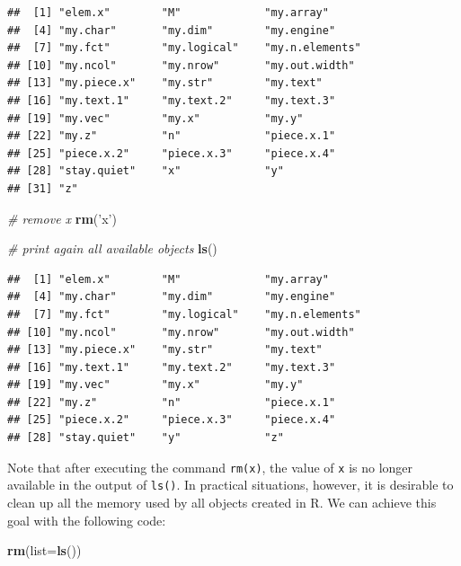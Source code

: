 \documentclass[11pt,]{book}
\newenvironment{Shaded}{\begin{snugshade}}{\end{snugshade}}
\newcommand{\KeywordTok}[1]{\textcolor[rgb]{0.27,0.27,0.27}{\textbf{#1}}}
\newcommand{\DataTypeTok}[1]{\textcolor[rgb]{0.27,0.27,0.27}{#1}}
\newcommand{\StringTok}[1]{\textcolor[rgb]{0.5,0.5,0.5}{#1}}
\newcommand{\CommentTok}[1]{\textcolor[rgb]{0.56,0.35,0.01}{\textit{#1}}}
\newcommand{\NormalTok}[1]{#1}
\begin{document}
\begin{verbatim}
##  [1] "elem.x"        "M"             "my.array"     
##  [4] "my.char"       "my.dim"        "my.engine"    
##  [7] "my.fct"        "my.logical"    "my.n.elements"
## [10] "my.ncol"       "my.nrow"       "my.out.width" 
## [13] "my.piece.x"    "my.str"        "my.text"      
## [16] "my.text.1"     "my.text.2"     "my.text.3"    
## [19] "my.vec"        "my.x"          "my.y"         
## [22] "my.z"          "n"             "piece.x.1"    
## [25] "piece.x.2"     "piece.x.3"     "piece.x.4"    
## [28] "stay.quiet"    "x"             "y"            
## [31] "z"
\end{verbatim}

\begin{Shaded}
\begin{Highlighting}[]
\CommentTok{# remove x}
\KeywordTok{rm}\NormalTok{(}\StringTok{'x'}\NormalTok{)}

\CommentTok{# print again all available objects}
\KeywordTok{ls}\NormalTok{()}
\end{Highlighting}
\end{Shaded}

\begin{verbatim}
##  [1] "elem.x"        "M"             "my.array"     
##  [4] "my.char"       "my.dim"        "my.engine"    
##  [7] "my.fct"        "my.logical"    "my.n.elements"
## [10] "my.ncol"       "my.nrow"       "my.out.width" 
## [13] "my.piece.x"    "my.str"        "my.text"      
## [16] "my.text.1"     "my.text.2"     "my.text.3"    
## [19] "my.vec"        "my.x"          "my.y"         
## [22] "my.z"          "n"             "piece.x.1"    
## [25] "piece.x.2"     "piece.x.3"     "piece.x.4"    
## [28] "stay.quiet"    "y"             "z"
\end{verbatim}

Note that after executing the command
\texttt{rm(\textquotesingle{}x\textquotesingle{})}, the value of
\texttt{x} is no longer available in the output of \texttt{ls()}. In
practical situations, however, it is desirable to clean up all the
memory used by all objects created in R. We can achieve this goal with
the following code:

\begin{Shaded}
\begin{Highlighting}[]
\KeywordTok{rm}\NormalTok{(}\DataTypeTok{list=}\KeywordTok{ls}\NormalTok{())}
\end{Highlighting}
\end{Shaded}
\end{document}
